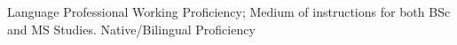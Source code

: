 
\begin{rubric}{Language}
    \entry*[English]
        Professional Working Proficiency; Medium of instructions for both BSc and MS Studies.
    \entry*[Bengali]
        Native/Bilingual Proficiency
\end{rubric}
    